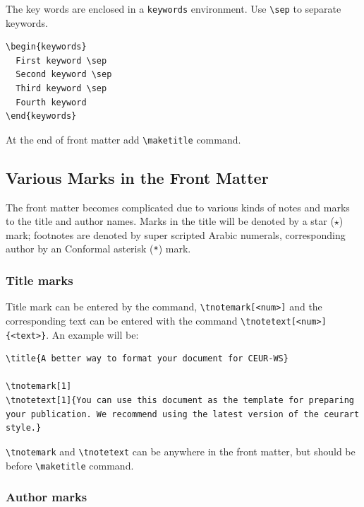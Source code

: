 \documentclass[
]{ceurart}
\begin{document}
The key words are enclosed in a \verb|keywords| environment. Use \verb|\sep| to separate keywords.

\begin{lstlisting}[language={[latex]TeX}]
\begin{keywords}
  First keyword \sep
  Second keyword \sep
  Third keyword \sep
  Fourth keyword
\end{keywords}
\end{lstlisting}

At the end of front matter add \verb|\maketitle| command.

\subsection{Various Marks in the Front Matter}

The front matter becomes complicated due to various kinds of notes and marks to the title and author names. Marks in the title will be denoted by a star ($\star$) mark; footnotes are denoted by super scripted Arabic numerals, corresponding author by an Conformal asterisk (\verb|*|) mark.

\subsubsection{Title marks}

Title mark can be entered by the command, \verb|\tnotemark[<num>]| and the corresponding text can be entered with the command \verb|\tnotetext[<num>]{<text>}|. An example will be:

\begin{lstlisting}[language={[latex]TeX}]
\title{A better way to format your document for CEUR-WS}

\tnotemark[1]
\tnotetext[1]{You can use this document as the template for preparing your publication. We recommend using the latest version of the ceurart style.}
\end{lstlisting}

\verb|\tnotemark| and \verb|\tnotetext| can be anywhere in the front matter, but should be before \verb|\maketitle| command.

\subsubsection{Author marks}
\end{document}
